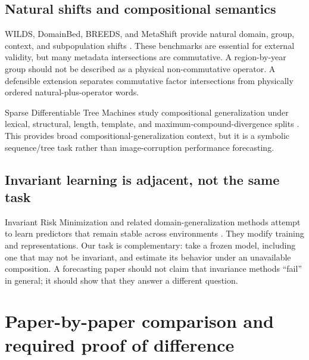 \documentclass[11pt,a4paper]{article}
\begin{document}
\subsection{Natural shifts and compositional semantics}

WILDS, DomainBed, BREEDS, and MetaShift provide natural domain, group, context,
and subpopulation shifts \cite{koh2021,gulrajani2021,santurkar2021,liang2022}.
These benchmarks are essential for external validity, but many metadata
intersections are commutative.  A region-by-year group should not be described
as a physical non-commutative operator.  A defensible extension separates
commutative factor intersections from physically ordered natural-plus-operator
words.

Sparse Differentiable Tree Machines study compositional generalization under
lexical, structural, length, template, and maximum-compound-divergence splits
\cite{soulos2024}.  This provides broad compositional-generalization context,
but it is a symbolic sequence/tree task rather than image-corruption
performance forecasting.

\subsection{Invariant learning is adjacent, not the same task}

Invariant Risk Minimization and related domain-generalization methods attempt
to learn predictors that remain stable across environments
\cite{arjovsky2019}.  They modify training and representations.  Our task is
complementary: take a frozen model, including one that may not be invariant,
and estimate its behavior under an unavailable composition.  A forecasting
paper should not claim that invariance methods ``fail'' in general; it should
show that they answer a different question.

\section{Paper-by-paper comparison and required proof of difference}
\end{document}
